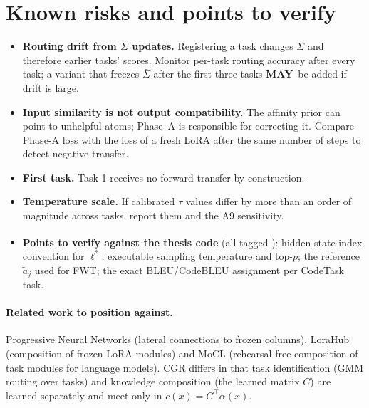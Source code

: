\documentclass[11pt]{article}
\newcommand{\T}{^{\top}}
\newcommand{\tagassumed}{\textsuperscript{\textcolor{red!70!black}{\sffamily[assumed]}}}
\newcommand{\MAY}{\textbf{MAY}}
\begin{document}
\section{Known risks and points to verify}\label{sec:risks}

\begin{itemize}[leftmargin=*]
  \item \textbf{Routing drift from $\bar\Sigma$ updates.} Registering a task changes $\bar\Sigma$ and therefore
        earlier tasks' scores. Monitor per-task routing accuracy after every task; a variant that freezes
        $\bar\Sigma$ after the first three tasks \MAY\ be added if drift is large.
  \item \textbf{Input similarity is not output compatibility.} The affinity prior can point to unhelpful atoms;
        Phase~A is responsible for correcting it. Compare Phase-A loss with the loss of a fresh LoRA after the same
        number of steps to detect negative transfer.
  \item \textbf{First task.} Task 1 receives no forward transfer by construction.
  \item \textbf{Temperature scale.} If calibrated $\tau$ values differ by more than an order of magnitude across
        tasks, report them and the A9 sensitivity.
  \item \textbf{Points to verify against the thesis code} (all tagged \tagassumed): hidden-state index convention
        for $\ell^*$; executable sampling temperature and top-$p$; the reference $\tilde a_j$ used for FWT; the
        exact BLEU/CodeBLEU assignment per CodeTask task.
\end{itemize}

\paragraph{Related work to position against.} Progressive Neural Networks (lateral connections to frozen
columns), LoraHub (composition of frozen LoRA modules) and MoCL (rehearsal-free composition of task modules for
language models). CGR differs in that task identification (GMM routing over tasks) and knowledge composition
(the learned matrix $C$) are learned separately and meet only in $c(x)=C\T\alpha(x)$.
\end{document}
